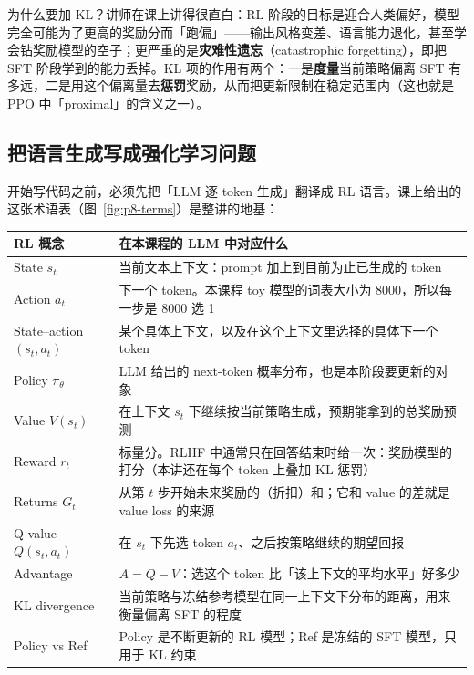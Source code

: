 为什么要加 KL？讲师在课上讲得很直白：RL 阶段的目标是迎合人类偏好，模型完全可能为了更高的奖励分而「跑偏」——输出风格变差、语言能力退化，甚至学会钻奖励模型的空子；更严重的是\textbf{灾难性遗忘}（catastrophic forgetting），即把 SFT 阶段学到的能力丢掉。KL 项的作用有两个：一是\textbf{度量}当前策略偏离 SFT 有多远，二是用这个偏离量去\textbf{惩罚}奖励，从而把更新限制在稳定范围内（这也就是 PPO 中「proximal」的含义之一）。

\subsection{把语言生成写成强化学习问题}

开始写代码之前，必须先把「LLM 逐 token 生成」翻译成 RL 语言。课上给出的这张术语表（图~\ref{fig:p8-terms}）是整讲的地基：

\begin{center}
\begin{tabular}{p{3.0cm}p{11.0cm}}
\toprule
RL 概念 & 在本课程的 LLM 中对应什么 \\
\midrule
State $s_t$ & 当前文本上下文：prompt 加上到目前为止已生成的 token \\
Action $a_t$ & 下一个 token。本课程 toy 模型的词表大小为 8000，所以每一步是 8000 选 1 \\
State--action $(s_t,a_t)$ & 某个具体上下文，以及在这个上下文里选择的具体下一个 token \\
Policy $\pi_\theta$ & LLM 给出的 next-token 概率分布，也是本阶段要更新的对象 \\
Value $V(s_t)$ & 在上下文 $s_t$ 下继续按当前策略生成，预期能拿到的总奖励预测 \\
Reward $r_t$ & 标量分。RLHF 中通常只在回答结束时给一次：奖励模型的打分（本讲还在每个 token 上叠加 KL 惩罚） \\
Returns $G_t$ & 从第 $t$ 步开始未来奖励的（折扣）和；它和 value 的差就是 value loss 的来源 \\
Q-value $Q(s_t,a_t)$ & 在 $s_t$ 下先选 token $a_t$、之后按策略继续的期望回报 \\
Advantage & $A=Q-V$：选这个 token 比「该上下文的平均水平」好多少 \\
KL divergence & 当前策略与冻结参考模型在同一上下文下分布的距离，用来衡量偏离 SFT 的程度 \\
Policy vs Ref & Policy 是不断更新的 RL 模型；Ref 是冻结的 SFT 模型，只用于 KL 约束 \\
\bottomrule
\end{tabular}
\end{center}

